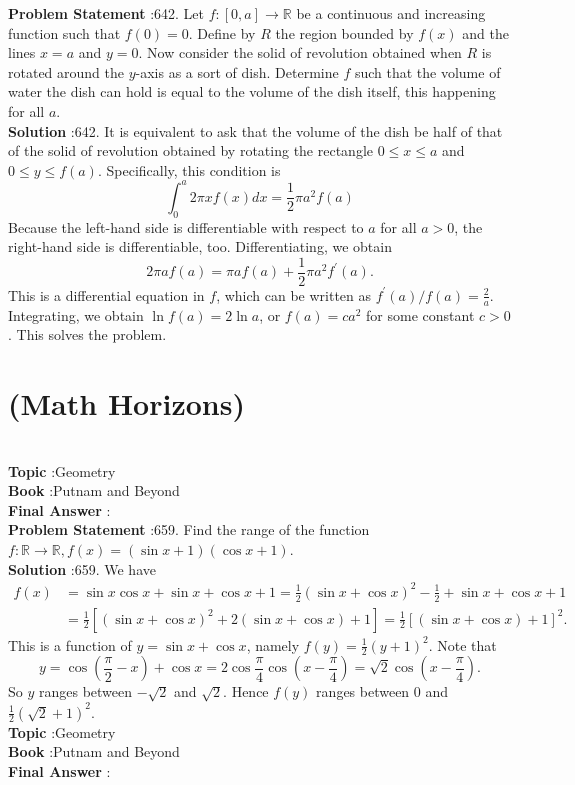 \documentclass[10pt]{article}
\begin{document}
\textbf{Problem Statement} :642. Let $f:[0, a] \rightarrow \mathbb{R}$ be a continuous and increasing function such that $f(0)=0$. Define by $R$ the region bounded by $f(x)$ and the lines $x=a$ and $y=0$. Now consider the solid of revolution obtained when $R$ is rotated around the $y$-axis as a sort of dish. Determine $f$ such that the volume of water the dish can hold is equal to the volume of the dish itself, this happening for all $a$.\\
\textbf{Solution} :642. It is equivalent to ask that the volume of the dish be half of that of the solid of revolution obtained by rotating the rectangle $0 \leq x \leq a$ and $0 \leq y \leq f(a)$. Specifically, this condition is$$ \int_{0}^{a} 2 \pi x f(x) d x=\frac{1}{2} \pi a^{2} f(a) $$Because the left-hand side is differentiable with respect to $a$ for all $a>0$, the right-hand side is differentiable, too. Differentiating, we obtain$$ 2 \pi a f(a)=\pi a f(a)+\frac{1}{2} \pi a^{2} f^{\prime}(a) . $$This is a differential equation in $f$, which can be written as $f^{\prime}(a) / f(a)=\frac{2}{a}$. Integrating, we obtain $\ln f(a)=2 \ln a$, or $f(a)=c a^{2}$ for some constant $c>0$. This solves the problem.\section{(Math Horizons)}\\
\textbf{Topic} :Geometry\\
\textbf{Book} :Putnam and Beyond\\
\textbf{Final Answer} :\\


\textbf{Problem Statement} :659. Find the range of the function $f: \mathbb{R} \rightarrow \mathbb{R}, f(x)=(\sin x+1)(\cos x+1)$.\\
\textbf{Solution} :659. We have$$ \begin{aligned} f(x) &=\sin x \cos x+\sin x+\cos x+1=\frac{1}{2}(\sin x+\cos x)^{2}-\frac{1}{2}+\sin x+\cos x+1 \\ &=\frac{1}{2}\left[(\sin x+\cos x)^{2}+2(\sin x+\cos x)+1\right]=\frac{1}{2}[(\sin x+\cos x)+1]^{2} . \end{aligned} $$This is a function of $y=\sin x+\cos x$, namely $f(y)=\frac{1}{2}(y+1)^{2}$. Note that$$ y=\cos \left(\frac{\pi}{2}-x\right)+\cos x=2 \cos \frac{\pi}{4} \cos \left(x-\frac{\pi}{4}\right)=\sqrt{2} \cos \left(x-\frac{\pi}{4}\right) . $$So $y$ ranges between $-\sqrt{2}$ and $\sqrt{2}$. Hence $f(y)$ ranges between 0 and $\frac{1}{2}(\sqrt{2}+1)^{2}$.\\
\textbf{Topic} :Geometry\\
\textbf{Book} :Putnam and Beyond\\
\textbf{Final Answer} :\\
\end{document}

